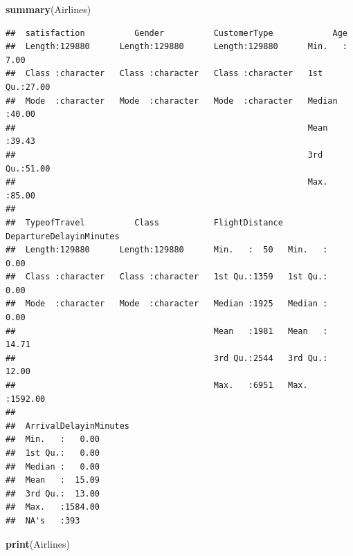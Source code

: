 \documentclass[
]{article}
\newenvironment{Shaded}{\begin{snugshade}}{\end{snugshade}}
\newcommand{\FunctionTok}[1]{\textcolor[rgb]{0.13,0.29,0.53}{\textbf{#1}}}
\newcommand{\NormalTok}[1]{#1}
\begin{document}
\begin{Shaded}
\begin{Highlighting}[]
\FunctionTok{summary}\NormalTok{(Airlines)}
\end{Highlighting}
\end{Shaded}

\begin{verbatim}
##  satisfaction          Gender          CustomerType            Age       
##  Length:129880      Length:129880      Length:129880      Min.   : 7.00  
##  Class :character   Class :character   Class :character   1st Qu.:27.00  
##  Mode  :character   Mode  :character   Mode  :character   Median :40.00  
##                                                           Mean   :39.43  
##                                                           3rd Qu.:51.00  
##                                                           Max.   :85.00  
##                                                                          
##  TypeofTravel          Class           FlightDistance DepartureDelayinMinutes
##  Length:129880      Length:129880      Min.   :  50   Min.   :   0.00        
##  Class :character   Class :character   1st Qu.:1359   1st Qu.:   0.00        
##  Mode  :character   Mode  :character   Median :1925   Median :   0.00        
##                                        Mean   :1981   Mean   :  14.71        
##                                        3rd Qu.:2544   3rd Qu.:  12.00        
##                                        Max.   :6951   Max.   :1592.00        
##                                                                              
##  ArrivalDelayinMinutes
##  Min.   :   0.00      
##  1st Qu.:   0.00      
##  Median :   0.00      
##  Mean   :  15.09      
##  3rd Qu.:  13.00      
##  Max.   :1584.00      
##  NA's   :393
\end{verbatim}

\begin{Shaded}
\begin{Highlighting}[]
\FunctionTok{print}\NormalTok{(Airlines)}
\end{Highlighting}
\end{Shaded}
\end{document}
